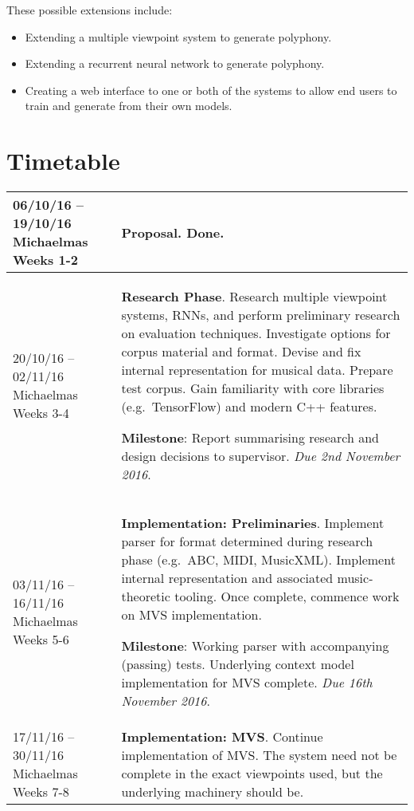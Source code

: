 \documentclass[12pt,a4paper,twoside]{article}
\begin{document}
These possible extensions include:
\begin{itemize}
	\item Extending a multiple viewpoint system to generate polyphony.
	\item Extending a recurrent neural network to generate polyphony.
  \item Creating a web interface to one or both of the systems to allow end
    users to train and generate from their own models.
\end{itemize}

\newpage

\section{Timetable}

\begin{longtable}{ p{4cm} | p{11cm} } \hline 

06/10/16 -- 19/10/16 Michaelmas Weeks 1-2 & \textbf{Proposal}. Done. \\ \hline
20/10/16 -- 02/11/16 Michaelmas Weeks 3-4 & \textbf{Research Phase}. 
Research multiple viewpoint systems, RNNs, and perform preliminary research on
evaluation techniques.  Investigate options for corpus material and format.
Devise and fix internal representation for musical data. Prepare test corpus.
Gain familiarity with core libraries (e.g.\ TensorFlow) and modern C++ features.
\newline

\textbf{Milestone}: Report summarising research and design decisions to
supervisor. \emph{Due 2nd November 2016}.
\\ \hline
03/11/16 -- 16/11/16 Michaelmas Weeks 5-6 & \textbf{Implementation:
	Preliminaries}.
Implement parser for format determined during research phase (e.g.\ ABC, MIDI,
MusicXML). Implement internal representation and associated music-theoretic
tooling. Once complete, commence work on MVS implementation. \newline

\textbf{Milestone}: Working parser with accompanying (passing) tests. Underlying
context model implementation for MVS complete. \emph{Due 16th
  November 2016}.
\\ \hline

17/11/16 -- 30/11/16 Michaelmas Weeks 7-8 & \textbf{Implementation: MVS}.
Continue implementation of MVS. The system need not be complete in the exact
viewpoints used, but the underlying machinery should be. \newline


\end{longtable}
\end{document}
